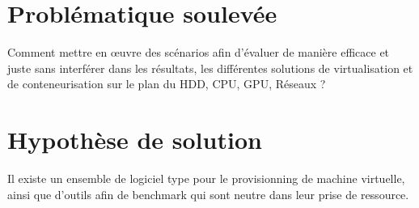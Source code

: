 \section{Problématique soulevée}

\begin{center} 
Comment mettre en œuvre des scénarios afin d'évaluer de manière efficace et juste sans interférer dans les résultats, les différentes solutions de virtualisation et de conteneurisation sur le plan du HDD, CPU, GPU, Réseaux ? 
\end{center}

\section{Hypothèse de solution}

Il existe un ensemble de logiciel type pour le provisionning de machine virtuelle, ainsi que d'outils afin de benchmark qui sont neutre dans leur prise de ressource.
